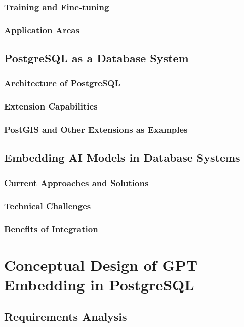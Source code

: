 \documentclass{article}
\begin{document}
\subsubsection{Training and Fine-tuning}
\subsubsection{Application Areas}

\subsection{PostgreSQL as a Database System}
\subsubsection{Architecture of PostgreSQL}
\subsubsection{Extension Capabilities}
\subsubsection{PostGIS and Other Extensions as Examples}

\subsection{Embedding AI Models in Database Systems}
\subsubsection{Current Approaches and Solutions}
\subsubsection{Technical Challenges}
\subsubsection{Benefits of Integration}

\newpage

\section{Conceptual Design of GPT Embedding in PostgreSQL}

\subsection{Requirements Analysis}
\end{document}
